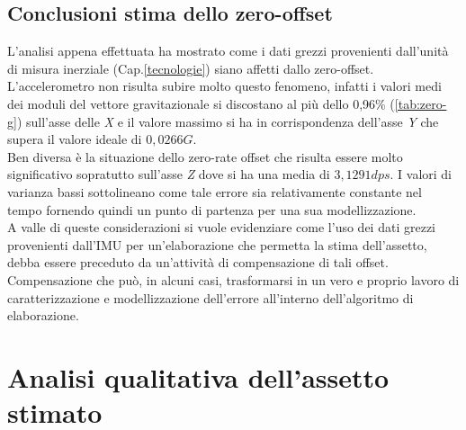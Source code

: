 \subsection{Conclusioni stima dello zero-offset}
L'analisi appena effettuata ha mostrato come i dati grezzi provenienti dall'unità di misura inerziale (Cap.\ref{tecnologie}) siano affetti dallo zero-offset.\\
L'accelerometro non risulta subire molto questo fenomeno, infatti i valori medi dei moduli del vettore gravitazionale si discostano al più dello 0,96\% (\ref{tab:zero-g}) sull'asse delle \textit{X} e il valore massimo si ha in corrispondenza dell'asse \textit{Y} che supera il valore ideale di $0,0266 G$. \\
Ben diversa è la situazione dello zero-rate offset che risulta essere molto significativo sopratutto sull'asse \textit{Z} dove si ha una media di $3,1291 dps$. I valori di varianza bassi sottolineano come tale errore sia relativamente constante nel tempo fornendo quindi un punto di partenza per una sua modellizzazione.\\
A valle di queste considerazioni si vuole evidenziare come l'uso dei dati grezzi provenienti dall'IMU per un'elaborazione che permetta la stima dell'assetto, debba essere preceduto da un'attività di compensazione di tali offset. Compensazione che può, in alcuni casi, trasformarsi in un vero e proprio lavoro di caratterizzazione e modellizzazione dell'errore all'interno dell'algoritmo di elaborazione. 





\section{Analisi qualitativa dell'assetto stimato}



